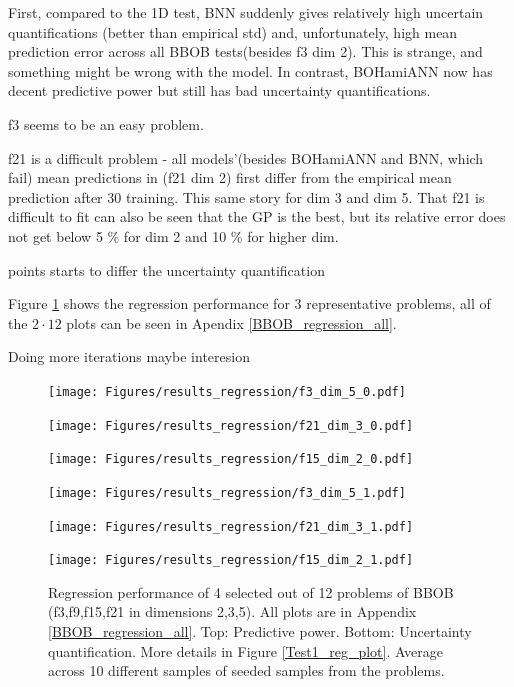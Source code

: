 First, compared to the 1D test, BNN suddenly gives relatively high
uncertain quantifications (better than empirical std) and, unfortunately, high mean prediction
error across all BBOB tests(besides f3 dim 2). This is strange, and something might be wrong with the model. In contrast, BOHamiANN 
now has decent predictive power but still has bad uncertainty quantifications. 

f3 seems to be an easy problem. 

f21 is a difficult problem - all models'(besides BOHamiANN and BNN, which fail) mean predictions in
(f21 dim 2) first differ from the empirical mean prediction after 30 training. This same story for
dim 3 and dim 5. That f21 is difficult to fit can also be seen that the GP is the best, but its relative error does not
get below 5 \% for dim 2 and 10 \% for higher dim. 



 points starts to differ the uncertainty quantification 

Figure \ref{BBOB_regression} shows the regression performance for 3
representative problems, all of the $2\cdot 12$ plots can be seen in Apendix
\ref{BBOB_regression_all}. 

Doing more iterations maybe interesion

\begin{figure}[H]
  \centering
  \begin{minipage}[b]{0.32\textwidth}
   \texttt{[image: Figures/results\_regression/f3\_dim\_5\_0.pdf]}
  \end{minipage}
  \hfill
  \begin{minipage}[b]{0.32\textwidth}
    \texttt{[image: Figures/results\_regression/f21\_dim\_3\_0.pdf]}
   \end{minipage}
   \hfill
   \begin{minipage}[b]{0.32\textwidth}
    \texttt{[image: Figures/results\_regression/f15\_dim\_2\_0.pdf]}
   \end{minipage}
   
     \begin{minipage}[b]{0.32\textwidth}
   \texttt{[image: Figures/results\_regression/f3\_dim\_5\_1.pdf]}
  \end{minipage}
  \hfill
  \begin{minipage}[b]{0.32\textwidth}
    \texttt{[image: Figures/results\_regression/f21\_dim\_3\_1.pdf]}
   \end{minipage}
   \hfill
   \begin{minipage}[b]{0.32\textwidth}
    \texttt{[image: Figures/results\_regression/f15\_dim\_2\_1.pdf]}
   \end{minipage}
   
  \caption{Regression performance of 4 selected out of 12 problems of BBOB (f3,f9,f15,f21 in
  dimensions 2,3,5). All plots are in Appendix \ref{BBOB_regression_all}. Top: Predictive power. Bottom: Uncertainty
  quantification. More details in Figure \ref{Test1_reg_plot}. Average across 10 different samples
  of seeded samples from the problems.}
  \label{BBOB_regression}
\end{figure}

